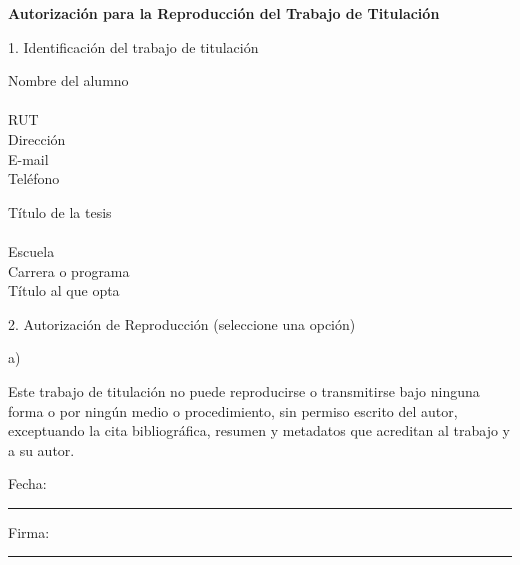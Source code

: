 \begingroup
{}


\small
\setlength{\parindent}{0pt}
\setlength{\parskip}{0pt}
\setlength{\tabcolsep}{5pt}
\renewcommand{\arraystretch}{1.12}

\begin{center}
\textbf{Autorización para la Reproducción del Trabajo de Titulación}
\end{center}

\vspace{0.8cm}

1. Identificación del trabajo de titulación

\vspace{0.35cm}

Nombre del alumno\\[-0.05cm]
\mbox{}\dotfill\\[-0.05cm]
RUT \dotfill\\[-0.05cm]
Dirección \dotfill\\[-0.05cm]
E-mail \dotfill\\[-0.05cm]
Teléfono \dotfill

\vspace{0.45cm}

Título de la tesis\\[-0.05cm]
\mbox{}\dotfill\\[-0.05cm]
Escuela \dotfill\\[-0.05cm]
Carrera o programa \dotfill\\[-0.05cm]
Título al que opta \dotfill

\vspace{0.45cm}

2. Autorización de Reproducción (seleccione una opción)

\vspace{0.25cm}

\noindent a)
\hspace{1.0cm}
\begin{minipage}[t]{0.84\textwidth}
Este trabajo de titulación no puede reproducirse o transmitirse bajo ninguna forma o por ningún medio o procedimiento, sin permiso escrito del autor, exceptuando la cita bibliográfica, resumen y metadatos que acreditan al trabajo y a su autor.

\vspace{0.75cm}

Fecha: \rule{36mm}{0.1mm}
\hspace{2.2cm}
Firma: \rule{55mm}{0.1mm}
\end{minipage}

